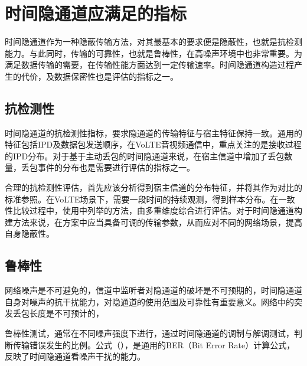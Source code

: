 \section{时间隐通道应满足的指标}
\label{chap:backinfo:metric}

时间隐通道作为一种隐蔽传输方法，对其最基本的要求便是隐蔽性，也就是抗检测能力。与此同时，传输的可靠性，也就是鲁棒性，在高噪声环境中也非常重要。为满足数据传输的需要，在传输性能方面达到一定传输速率。时间隐通道构造过程产生的代价，及数据保密性也是评估的指标之一。

\subsection{抗检测性}
\label{chap:backinfo:metric:undetectability}

时间隐通道的抗检测性指标，要求隐通道的传输特征与宿主特征保持一致。通用的特征包括IPD及数据包发送顺序，在VoLTE音视频通信中，重点关注的是接收过程的IPD分布。对于基于主动丢包的时间隐通道来说，在宿主信道中增加了丢包数量，丢包事件的分布也是需要进行评估的指标之一。

合理的抗检测性评估，首先应该分析得到宿主信道的分布特征，并将其作为对比的标准参照。在VoLTE场景下，需要一段时间的持续观测，得到样本分布。在一致性比较过程中，使用中列举的方法，由多重维度综合进行评估。对于时间隐通道构建方法来说，在方案中应当具备可调的传输参数，从而应对不同的网络场景，提高自身隐蔽性。

\subsection{鲁棒性}
\label{chap:backinfo:metric:robustness}

网络噪声是不可避免的，信道中监听者对隐通道的破坏是不可预期的，时间隐通道自身对噪声的抗干扰能力，对隐通道的使用范围及可靠性有重要意义。网络中的突发丢包长度是不可预计的，


鲁棒性测试，通常在不同噪声强度下进行，通过时间隐通道的调制与解调测试，判断传输错误发生的比例。公式（），是通用的BER（Bit Error Rate）计算公式，反映了时间隐通道看噪声干扰的能力。

